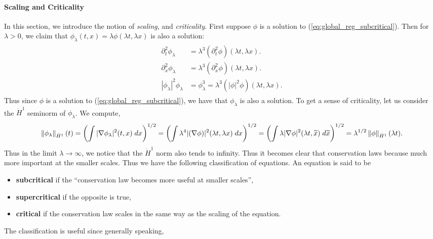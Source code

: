 \documentclass{article}
\begin{document}
\paragraph{Scaling and Criticality} In this section, we introduce the notion of \textit{scaling}, and \textit{criticality}. First suppose $\phi$ is a solution to (\ref{eq:global_reg_subcritical}). Then for $\lambda > 0$, we claim that $\phi_{\lambda}(t, x) = \lambda \phi(\lambda t, \lambda x)$ is also a solution: 
\begin{align*}
	\begin{split}
		\partial_{t}^{2}\phi_{\lambda} &= \lambda^{3}(\partial_{t}^{2}\phi)(\lambda t, \lambda x). \\
		\partial_{x}^{2}\phi_{\lambda} &= \lambda^{3}(\partial_{x}^{2}\phi)(\lambda t, \lambda x). \\
		|\phi_{\lambda}|^{2}\phi_{\lambda} &= \phi_{\lambda}^{3} = \lambda^{3}(|\phi|^{2}\phi)(\lambda t,\lambda x). 
	\end{split} 
\end{align*} 
Thus since $\phi$ is a solution to (\ref{eq:global_reg_subcritical}), we have that $\phi_{\lambda}$ is also a solution. To get a sense of criticality, let us consider the $\dot{H}^{1}$ seminorm of $\phi_{\lambda}$. We compute, 
\begin{equation*}
	\left\Vert \phi_{\lambda} \right\Vert_{\dot{H}^{1}}(t) = \left(\int |\nabla \phi_{\lambda}|^{2}(t,x)\;dx\right)^{1/2}  = \left(\int \lambda^{4}|(\nabla \phi)|^{2}(\lambda t,\lambda x)\;dx\right)^{1/2} = \left(\int \lambda|\nabla \phi|^{2}(\lambda t, \widetilde{x})\;d\widetilde{x}\right)^{1/2} = \lambda^{1/2}\left\Vert \phi \right\Vert_{\dot{H}^{1}}(\lambda t). 
\end{equation*}
Thus in the limit $\lambda \to \infty$, we notice that the $\dot{H}^{1}$ norm also tends to infinity. Thus it becomes clear that conservation laws because much more important at the smaller scales. Thus we have the following classification of equations. An equation is said to be \vspace{-0.25cm}
\begin{itemize}[itemsep =-2pt]
	\item \textbf{subcritical} if the ``conservation law becomes more useful at smaller scales'', 
	\item \textbf{supercritical} if the opposite is true, 
	\item \textbf{critical} if the conservation law scales in the same way as the scaling of the equation. 
\end{itemize}
The classification is useful since generally speaking, \vspace{-0.25cm}
\end{document}
